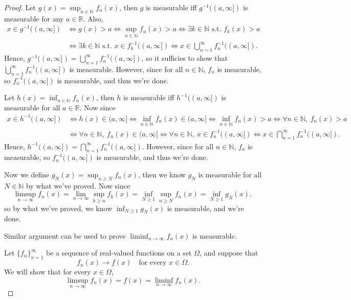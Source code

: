 \begin{proof}
    Let \(g(x) = \sup _{n \in \mathbb{N}} f_n(x)\), then \(g\) is measurable iff \(g^{-1}((a,\infty ])\) is measurable for any \(a \in \mathbb{R}\). Also,
    \begin{align*}
        x \in g^{-1}((a, \infty]) &\iff g(x) > a \iff \sup_{n \in \mathbb{N}} f_n(x) > a  \iff \exists k \in \mathbb{N} \text{ s.t. } f_k(x) > a \\
        & \iff \exists k \in \mathbb{N} \text{ s.t. } x \in f_k^{-1}((a, \infty]) \iff x \in \bigcup_{n=1}^{\infty} f_n^{-1}((a, \infty]). 
    \end{align*}    
    Hence, \(g^{-1} ((a, \infty]) = \bigcup_{n=1}^{\infty} f_n^{-1}((a,\infty]) \), so it sufficies to show that \(\bigcup_{n=1}^{\infty} f_n^{-1}((a, \infty]) \) is measurable. However, since for all \(n \in \mathbb{N}\), \(f_n\) is measurable, so \(f_n^{-1}((a, \infty])\) is measurable, and thus we're done. 

    Let \(h(x) = \inf _{n \in \mathbb{N}} f_n(x)\), then \(h\) is measurable iff \(h^{-1}((a, \infty])\) is measurable for all \(a \in \mathbb{R}\). Now since 
    \begin{align*}
        x \in h^{-1}((a, \infty]) &\iff h(x) \in (a, \infty] \iff \inf_{n \in \mathbb{N}} f_n(x) \in (a, \infty] \iff \inf _{n \in \mathbb{N} } f_n(x) > a \iff \forall n \in \mathbb{N}, \ f_n(x) > a \\
        &\iff \forall n \in \mathbb{N} , \ f_n(x) \in (a, \infty] \iff \forall n \in \mathbb{N} , \ x \in f_n^{-1}((a, \infty]) \iff x \in \bigcap_{n=1}^{\infty} f_n^{-1}((a, \infty]).
    \end{align*}         
    Hence, \(h^{-1}((a, \infty]) = \bigcap_{n=1}^{\infty} f_n^{-1}((a, \infty])\). However, since for all \(n \in \mathbb{N}\), \(f_n\) is measurable, so \(f_n^{-1}((a, \infty])\) is measurable, and thus we're done.

    Now we define \(g_N(x) = \sup _{n \ge N} f_n(x)\), then we know \(g_N\) is measurable for all \(N \in \mathbb{N}\) by what we've proved. Now since 
    \[
        \limsup_{n \to \infty} f_n(x) = \lim_{n \to \infty} \sup _{k \ge n} f_k(x) = \inf _{N \ge 1} \sup _{n \ge N} f_n(x) = \inf_{N \ge 1} g_N(x),  
    \]  
    so by what we've proved, we know \(\inf_{N \ge 1} g_N(x)\) is measurable, and we're done. 

    Similar argument can be used to prove \(\liminf_{n \to \infty} f_n(x) \) is measurable.

    Let $\{f_n\}_{n=1}^\infty$ be a sequence of real-valued functions on a set $\Omega$, and suppose that
\[
f_n(x) \to f(x) \quad \text{for every } x \in \Omega.
\]
We will show that for every $x \in \Omega$,
\[
\limsup_{n\to\infty} f_n(x) = f(x) = \liminf_{n\to\infty} f_n(x).
\]


\end{proof}
